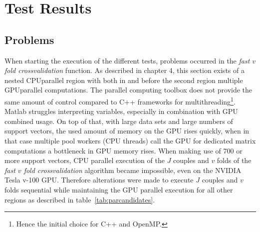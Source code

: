 \section{Test Results}
\subsection{Problems}
When starting the execution of the different tests, problems occurred in the \textit{fast $v$ fold crossvalidation} function.
As described in chapter 4, this section exists of a nested CPUparallel region with both in and before the second region multiple GPUparallel computations.
The parallel computing toolbox does not provide the same amount of control compared to C++ frameworks for multithreading\footnote{Hence the initial choice for C++ and OpenMP.}.
Matlab struggles interpreting variables, especially in combination with GPU combined usage.
On top of that, with large data sets and large numbers of support vectors, the used amount of memory on the GPU rises quickly, when in that case multiple pool workers (CPU threads) call the GPU for dedicated matrix computations a bottleneck in GPU memory rises.
When making use of 700 or more support vectors, CPU parallel execution of the $J$ couples and $v$ folds of the \textit{fast $v$ fold crossvalidation} algorithm became impossible, even on the NVIDIA Tesla v-100 GPU.
Therefore alterations were made to execute $J$ couples and $v$ folds sequential while maintaining the GPU parallel execution for all other regions as described in table~\ref{tab:parcandidates}.
